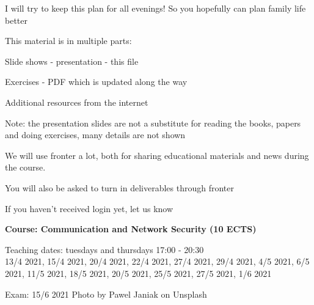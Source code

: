\documentclass[Screen16to9,17pt]{foils}
\begin{document}
\centerline{I will try to keep this plan for all evenings! So you hopefully can plan family life better}



\begin{list1}
\item This material is in multiple parts:

\item Slide shows - presentation - this file
\item Exercises - PDF which is updated along the way

\item Additional resources from the internet

\end{list1}

{\Large Note: the presentation slides are not a substitute for reading the books, papers and doing exercises, many details are not shown}



We will use fronter a lot, both for sharing educational materials and news during the course.

You will also be asked to turn in deliverables through fronter


\vskip 5mm
\centerline{If you haven't received login yet, let us know}






{\Large\bf Course: Communication and Network Security (10 ECTS)}

Teaching dates: tuesdays and thursdays 17:00 - 20:30\\
13/4 2021, 15/4 2021, 20/4 2021, 22/4 2021, 27/4 2021, 29/4 2021, 4/5 2021, 6/5 2021, 11/5 2021, 18/5 2021, 20/5 2021, 25/5 2021, 27/5 2021, 1/6 2021

Exam: 15/6 2021 \hskip 12cm Photo by Pawel Janiak on Unsplash



\end{document}
